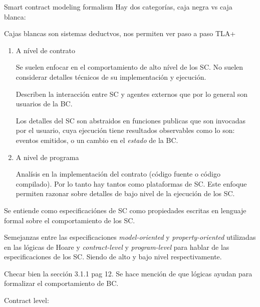 Smart contract modeling formalism
Hay dos categorías, caja negra vs caja blanca:

Cajas blancas son sistemas deductvos, nos permiten ver paso a paso TLA+
\begin{enumerate}
\item A nível de contrato

  Se suelen enfocar en el comportamiento de alto nível
  de los SC. No suelen considerar detalles técnicos
  de su implementación y ejecución.

  Describen la interacción entre SC y agentes externos
  que por lo general son usuarios de la BC.

  Los detalles del SC son abstraidos en funciones publicas
  que son invocadas por el usuario, cuya ejecución tiene
  resultados observables como lo son: eventos emitidos, o
  un cambio en el {\it estado} de la BC.

\item A nivel de programa

  Analísis en la implementación del contrato (código fuente
  o código compilado). Por lo tanto hay tantos como plataformas
  de SC.  Este enfoque permiten razonar sobre detalles de bajo
  nivel de la ejecución de los SC. 
\end{enumerate}

Se entiende como especificaciónes de SC
como propiedades escritas en lenguaje formal
sobre el comportamiento de los SC.

Semejanzas entre las especificaciones
{\it model-oriented} y {\it property-oriented}
utilizadas en las lógicas de Hoare y
{\it contract-level} y {\it program-level}
para hablar de las especificaciones de los SC.
Siendo de alto y bajo nivel respectivamente.

Checar bien la sección 3.1.1 pag 12. Se hace mención
de que lógicas ayudan para formalizar el comportamiento
de BC.

Contract level:

